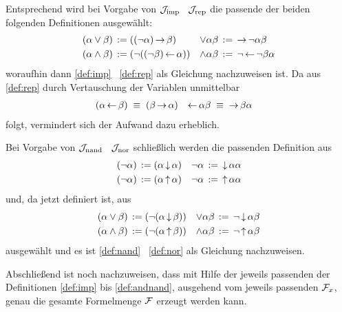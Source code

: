 Entsprechend wird bei Vorgabe von $\mathcal{J}_{\mathrm{imp}}$ \textbzgl\ $\mathcal{J}_{\mathrm{rep}}$ die passende der beiden folgenden Definitionen ausgewählt:
\begin{align}
	(\alpha \lor  \beta) & \;\operatorname{:\!\operatorname{=}}\; ((\lnot \alpha) \operatorname{\rightarrow} \beta)         &
	\lor \alpha   \beta  & \;\operatorname{:\!\operatorname{=}}\;   \operatorname{\rightarrow} \lnot \alpha \beta
	\label{def:orrep}
	\\
	(\alpha \land \beta) & \;\operatorname{:\!\operatorname{=}}\; (\lnot ((\lnot \beta) \operatorname{\leftarrow} \alpha)) &
	\land \alpha  \beta  & \;\operatorname{:\!\operatorname{=}}\;  \lnot \operatorname{\leftarrow} \lnot \beta \alpha
	\label{def:andrep}
\end{align}
woraufhin dann \eqref{def:imp} \textbzgl\ \eqref{def:rep} als Gleichung nachzuweisen ist.
Da aus \eqref{def:rep} durch Vertauschung der Variablen unmittelbar
\begin{align}
	(\alpha \operatorname{\leftarrow} \beta) & \;\equiv\; (\beta \operatorname{\rightarrow} \alpha) &
	\operatorname{\leftarrow} \alpha  \beta  & \;\equiv\;  \operatorname{\rightarrow} \beta \alpha  \label{eq:repimp}
\end{align}
folgt, vermindert sich der Aufwand dazu erheblich.

Bei Vorgabe von $\mathcal{J}_{\mathrm{nand}}$ \textbzgl\ $\mathcal{J}_{\mathrm{nor}}$ schließlich werden die passenden Definition aus
\begin{align}
	(\lnot \alpha) & \;\operatorname{:\!\operatorname{=}}\; (\alpha \operatorname{\downarrow} \alpha)  &
	\lnot  \alpha  & \;\operatorname{:\!\operatorname{=}}\;  \operatorname{\downarrow} \alpha \alpha   \label{def:notnor} \\
	(\lnot \alpha) & \;\operatorname{:\!\operatorname{=}}\; (\alpha \operatorname{\uparrow} \alpha) &
	\lnot  \alpha  & \;\operatorname{:\!\operatorname{=}}\;  \operatorname{\uparrow} \alpha \alpha  \label{def:notnand}
\end{align}
und, da \symqt{$\lnot$} jetzt definiert ist, aus
\begin{align}
	(\alpha \lor \beta)  & \;\operatorname{:\!\operatorname{=}}\; (\lnot(\alpha \operatorname{\downarrow} \beta))  &
	\lor \alpha  \beta   & \;\operatorname{:\!\operatorname{=}}\;  \lnot \operatorname{\downarrow} \alpha \beta
	\label{def:ornor} \\
	(\alpha \land \beta) & \;\operatorname{:\!\operatorname{=}}\; (\lnot(\alpha \operatorname{\uparrow} \beta)) &
	\land \alpha  \beta  & \;\operatorname{:\!\operatorname{=}}\;  \lnot \operatorname{\uparrow} \alpha \beta
	\label{def:andnand}
\end{align}
ausgewählt und es ist \eqref{def:nand} \textbzgl\ \eqref{def:nor} als Gleichung nachzuweisen.

Abschließend ist noch nachzuweisen, dass mit Hilfe der jeweils passenden der Definitionen \eqref{def:imp} bis \eqref{def:andnand}, ausgehend vom jeweils passenden $\mathcal{F}_x$, genau die gesamte Formelmenge $\mathcal{F}$ erzeugt werden kann.

